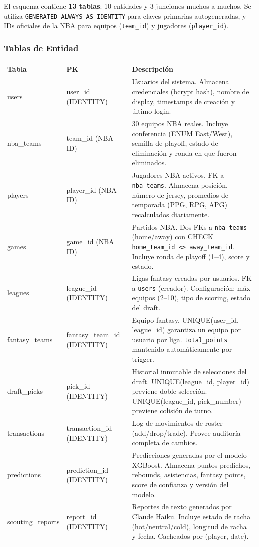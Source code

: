 \documentclass[12pt,a4paper]{article}
\begin{document}
El esquema contiene \textbf{13 tablas}: 10 entidades y 3 junciones muchos-a-muchos.
Se utiliza \texttt{GENERATED ALWAYS AS IDENTITY} para claves primarias autogeneradas,
y IDs oficiales de la NBA para equipos (\texttt{team\_id}) y jugadores (\texttt{player\_id}).

\subsubsection{Tablas de Entidad}

\begin{longtable}{>{\ttfamily\small}p{3.5cm} p{4cm} p{7cm}}
\toprule
\normalfont\textbf{Tabla} & \textbf{PK} & \textbf{Descripci\'on} \\
\midrule
\endhead
users & user\_id (IDENTITY) & Usuarios del sistema. Almacena credenciales (bcrypt hash), nombre de display, timestamps de creaci\'on y \'ultimo login. \\[6pt]
nba\_teams & team\_id (NBA ID) & 30 equipos NBA reales. Incluye conferencia (ENUM East/West), semilla de playoff, estado de eliminaci\'on y ronda en que fueron eliminados. \\[6pt]
players & player\_id (NBA ID) & Jugadores NBA activos. FK a \texttt{nba\_teams}. Almacena posici\'on, n\'umero de jersey, promedios de temporada (PPG, RPG, APG) recalculados diariamente. \\[6pt]
games & game\_id (NBA ID) & Partidos NBA. Dos FKs a \texttt{nba\_teams} (home/away) con CHECK \texttt{home\_team\_id <> away\_team\_id}. Incluye ronda de playoff (1--4), score y estado. \\[6pt]
leagues & league\_id (IDENTITY) & Ligas fantasy creadas por usuarios. FK a \texttt{users} (creador). Configuraci\'on: m\'ax equipos (2--10), tipo de scoring, estado del draft. \\[6pt]
fantasy\_teams & fantasy\_team\_id (IDENTITY) & Equipo fantasy. UNIQUE(user\_id, league\_id) garantiza un equipo por usuario por liga. \texttt{total\_points} mantenido autom\'aticamente por trigger. \\[6pt]
draft\_picks & pick\_id (IDENTITY) & Historial inmutable de selecciones del draft. UNIQUE(league\_id, player\_id) previene doble selecci\'on. UNIQUE(league\_id, pick\_number) previene colisi\'on de turno. \\[6pt]
transactions & transaction\_id (IDENTITY) & Log de movimientos de roster (add/drop/trade). Provee auditor\'ia completa de cambios. \\[6pt]
predictions & prediction\_id (IDENTITY) & Predicciones generadas por el modelo XGBoost. Almacena puntos predichos, rebounds, asistencias, fantasy points, score de confianza y versi\'on del modelo. \\[6pt]
scouting\_reports & report\_id (IDENTITY) & Reportes de texto generados por Claude Haiku. Incluye estado de racha (hot/neutral/cold), longitud de racha y fecha. Cacheados por (player, date). \\
\bottomrule
\end{longtable}
\end{document}
